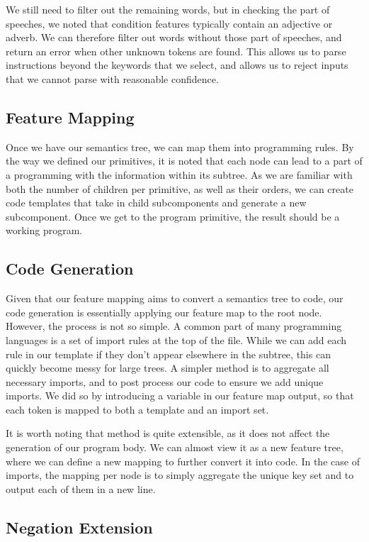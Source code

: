 \documentclass[11pt,letterpaper]{article}
\begin{document}
We still need to filter out the remaining words, but in checking the part of speeches, we noted that condition features typically contain an adjective or adverb.
We can therefore filter out words without those part of speeches, and return an error when other unknown tokens are found.
This allows us to parse instructions beyond the keywords that we select, and allows us to reject inputs that we cannot parse with reasonable confidence.

\subsection{Feature Mapping}

Once we have our semantics tree, we can map them into programming rules.
By the way we defined our primitives, it is noted that each node can lead to a part of a programming with the information within its subtree.
As we are familiar with both the number of children per primitive, as well as their orders, we can create code templates that take in child subcomponents and generate a new subcomponent.
Once we get to the program primitive, the result should be a working program.

\subsection{Code Generation}

Given that our feature mapping aims to convert a semantics tree to code, our code generation is essentially applying our feature map to the root node.
However, the process is not so simple.
A common part of many programming languages is a set of import rules at the top of the file.
While we can add each rule in our template if they don't appear elsewhere in the subtree, this can quickly become messy for large trees.
A simpler method is to aggregate all necessary imports, and to post process our code to ensure we add unique imports.
We did so by introducing a variable in our feature map output, so that each token is mapped to both a template and an import set.

It is worth noting that method is quite extensible, as it does not affect the generation of our program body.
We can almost view it as a new feature tree, where we can define a new mapping to further convert it into code.
In the case of imports, the mapping per node is to simply aggregate the unique key set and to output each of them in a new line.

\subsection{Negation Extension}
\end{document}
